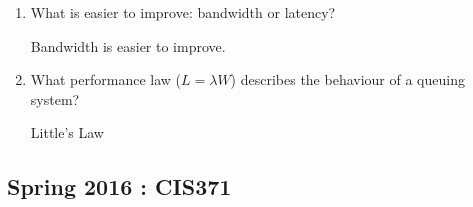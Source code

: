 \documentclass[12pt]{article}
\newenvironment{QandA}{\begin{enumerate}[label=\bfseries\arabic*.]\bfseries}
                      {\end{enumerate}}
\newenvironment{answered}{\par\quad\normalfont}{}
\begin{document}
\begin{QandA}
   \item What is easier to improve: bandwidth or latency?
        \begin{answered}
        Bandwidth is easier to improve.
        \end{answered}
    \item What performance law ($L=\lambda W$) describes the behaviour of a queuing system?
        \begin{answered}
        Little's Law
        \end{answered}
\end{QandA}

\subsection{Spring 2016 : CIS371}
\end{document}
